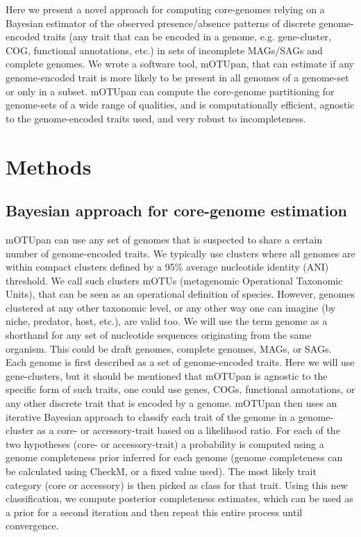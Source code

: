 \documentclass{article}
\begin{document}
Here we present a novel approach for computing core-genomes relying on a Bayesian estimator of the observed presence/absence patterns of discrete genome-encoded traits (any trait that can be encoded in a genome, e.g. gene-cluster, COG, functional annotations, etc.) in sets of incomplete MAGs/SAGs and complete genomes. We wrote a software tool, mOTUpan, that can estimate if any genome-encoded trait is more likely to be present in all genomes of a genome-set or only in a subset. mOTUpan can compute the core-genome partitioning for genome-sets of a wide range of qualities, and is computationally efficient, agnostic to the genome-encoded traits used, and very robust to incompleteness.

\section*{Methods}
\subsection*{Bayesian approach for core-genome estimation}

mOTUpan can use any set of genomes that is suspected to share a certain number of genome-encoded traits. We typically use clusters where all genomes are within compact clusters defined by a 95\% average nucleotide identity (ANI) threshold. We call such clusters mOTUs (metagenomic Operational Taxonomic Units), that can be seen as an operational definition of species. However, genomes clustered at any other taxonomic level, or any other way one can imagine (by niche, predator, host, etc.), are valid too.  We will use the term genome as a shorthand for any set of nucleotide sequences originating from the same organism. This could be draft genomes, complete genomes, MAGs, or SAGs. Each genome is first described as a set of genome-encoded traits. Here we will use gene-clusters, but it should be mentioned that mOTUpan is agnostic to the specific form of such traits, one could use genes, COGs, functional annotations, or any other discrete trait that is encoded by a genome. mOTUpan then uses an iterative Bayesian approach to classify each trait of the genome in a genome-cluster as a core- or accessory-trait based on a likelihood ratio. For each of the two hypotheses (core- or accessory-trait) a probability is computed using a genome completeness prior inferred for each genome (genome completeness can be calculated using CheckM\citep{parks_2015}, or a fixed value used). The most likely trait category (core or accessory) is then picked as class for that trait. Using this new classification, we compute posterior completeness estimates, which can be used as a prior for a second iteration and then repeat this entire process until convergence.
\end{document}
